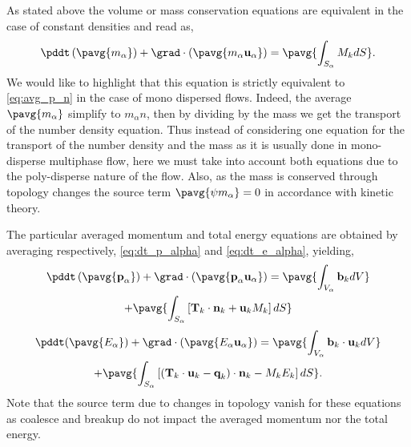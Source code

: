 As stated above the volume or mass conservation equations are equivalent in the case of constant densities and read as, 
\begin{equation}
    \pddt   \left(\pavg{m_\alpha}\right)
    + \grad \cdot \left(\pavg{m_\alpha \textbf{u}_\alpha}\right) 
    = 
    \pavg{\int_{S_\alpha} M_k d S}. 
    \label{eq:avg_p_m_mass}
\end{equation}
We would like to highlight that this equation is strictly equivalent to \ref{eq:avg_p_n} in the case of mono dispersed flows. 
Indeed, the average $\pavg{m_\alpha}$ simplify to $m_\alpha n$, then by dividing by the mass we get the transport of the number density equation. 
Thus instead of considering one equation for the transport of the number density and the mass as it is usually done in mono-disperse multiphase flow, here we must take into account both equations due to the poly-disperse nature of the flow. 
Also, as the mass is conserved through topology changes the source term $\pavg{\psi m_\alpha} = 0$ in accordance with kinetic theory.

The particular averaged momentum and total energy equations are obtained by averaging respectively, \ref{eq:dt_p_alpha} and \ref{eq:dt_e_alpha}, yielding, 
\begin{multline}
    \pddt   \left(\pavg{\textbf{p}_\alpha}\right)
    + \grad \cdot (\pavg{\textbf{p}_\alpha \textbf{u}_\alpha})
    = \pavg{\int_{V_\alpha} \textbf{b}_k dV}\\
    + \pavg{\int_{S_\alpha} \left[\textbf{T}_k  \cdot \textbf{n}_k  + \textbf{u}_k M_k \right]d S}
    \label{eq:avg_p_momentum}
\end{multline}
\begin{multline}
    \pddt (\pavg{E_\alpha})
    + \grad \cdot ( \pavg{E_\alpha \textbf{u}_\alpha})
    = \pavg{\int_{V_\alpha} \textbf{b}_k \cdot \textbf{u}_k dV}\\
    + \pavg{\int_{S_\alpha} \left[
        (\textbf{T}_k\cdot \textbf{u}_k 
    - \textbf{q}_k)\cdot\textbf{n}_k 
    - M_k E_k 
    \right]dS}.
    \label{eq:avg_p_energy}
\end{multline}
Note that the source term due to changes in topology vanish for these equations as coalesce and breakup do not impact the averaged momentum nor the total energy.  

